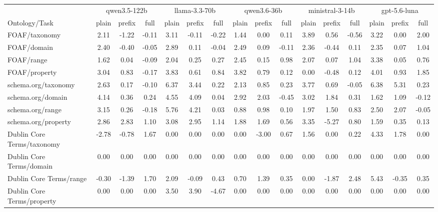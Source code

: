 \begin{tabular}{lccccccccccccccc}
\toprule
 & \multicolumn{3}{c}{qwen3.5-122b} & \multicolumn{3}{c}{llama-3.3-70b} & \multicolumn{3}{c}{qwen3.6-36b} & \multicolumn{3}{c}{ministral-3-14b} & \multicolumn{3}{c}{gpt-5.6-luna} \\
\cmidrule(lr){2-4} \cmidrule(lr){5-7} \cmidrule(lr){8-10} \cmidrule(lr){11-13} \cmidrule(lr){14-16}
Ontology/Task & plain & prefix & full & plain & prefix & full & plain & prefix & full & plain & prefix & full & plain & prefix & full \\
\midrule
FOAF/taxonomy & 2.11 & -1.22 & -0.11 & 3.11 & -0.11 & -0.22 & 1.44 & 0.00 & 0.11 & 3.89 & 0.56 & -0.56 & 3.22 & 0.00 & 2.00 \\
FOAF/domain & 2.40 & -0.40 & -0.05 & 2.89 & 0.11 & -0.04 & 2.49 & 0.09 & -0.11 & 2.36 & -0.44 & 0.11 & 2.35 & 0.07 & 1.04 \\
FOAF/range & 1.62 & 0.04 & -0.09 & 2.04 & 0.25 & 0.27 & 2.45 & 0.15 & 0.98 & 2.07 & 0.07 & 1.04 & 3.38 & 0.05 & 0.76 \\
FOAF/property & 3.04 & 0.83 & -0.17 & 3.83 & 0.61 & 0.84 & 3.82 & 0.79 & 0.12 & 0.00 & -0.48 & 0.12 & 4.01 & 0.93 & 1.85 \\
schema.org/taxonomy & 2.63 & 0.17 & -0.10 & 6.37 & 3.44 & 0.22 & 2.13 & 0.85 & 0.23 & 3.77 & 0.69 & -0.05 & 6.38 & 5.31 & 0.23 \\
schema.org/domain & 4.14 & 0.36 & 0.24 & 4.55 & 4.09 & 0.04 & 2.92 & 2.03 & -0.45 & 3.02 & 1.84 & 0.31 & 1.62 & 1.09 & -0.12 \\
schema.org/range & 3.15 & 0.26 & -0.18 & 5.76 & 4.21 & 0.03 & 0.88 & 0.98 & 0.10 & 1.97 & 1.50 & 0.83 & 2.50 & 2.07 & -0.05 \\
schema.org/property & 2.86 & 2.83 & 1.10 & 3.08 & 2.95 & 1.14 & 1.88 & 1.69 & 0.56 & 3.35 & -5.27 & 0.80 & 1.59 & 0.35 & 0.13 \\
Dublin Core Terms/taxonomy & -2.78 & -0.78 & 1.67 & 0.00 & 0.00 & 0.00 & 0.00 & -3.00 & 0.67 & 1.56 & 0.00 & 0.22 & 4.33 & 1.78 & 0.00 \\
Dublin Core Terms/domain & 0.00 & 0.00 & 0.00 & 0.00 & 0.00 & 0.00 & 0.00 & 0.00 & 0.00 & 0.00 & 0.00 & 0.00 & 0.00 & 0.00 & 0.00 \\
Dublin Core Terms/range & -0.30 & -1.39 & 1.70 & 2.09 & -0.09 & 0.43 & 0.70 & 1.39 & 0.35 & 0.00 & -1.87 & 2.48 & 5.43 & -0.35 & 0.35 \\
Dublin Core Terms/property & 0.00 & 0.00 & 0.00 & 3.50 & 3.90 & -4.67 & 0.00 & 0.00 & 0.00 & 0.00 & 0.00 & 0.00 & 0.00 & 0.00 & 0.00 \\

\end{tabular}
